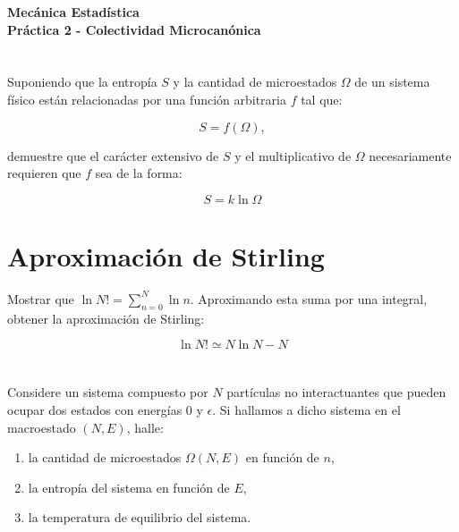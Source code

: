 \documentclass[a4paper,11pt]{article}
\begin{document}
\pagestyle{fancy}
\chead{\small \the\year}



\thispagestyle{plain}
\begin{center}
    \textbf{\large
        Mecánica Estadística \\
        Práctica 2 - Colectividad Microcanónica
    }
\end{center}
\vspace{-1.5em}



\section{}

Suponiendo que la entropía $S$ y la cantidad de microestados
$\Omega$ de un sistema físico están relacionadas por una función
arbitraria $f$ tal que:

$$ S = f(\Omega), $$

\noindent demuestre que el carácter extensivo de $S$ y el multiplicativo de
$\Omega$ necesariamente requieren que $f$ sea de la forma:

$$ S = k \ln \Omega $$



\section{Aproximación de Stirling}

Mostrar que $\ln N! = \sum_{n=0}^N \ln n$.
Aproximando esta suma por una integral, obtener la aproximación de
Stirling:

$$ \ln N! \simeq N \ln N - N $$


\section{}

Considere un sistema compuesto por $N$ partículas no interactuantes que pueden ocupar
dos estados con energías 0 y $\epsilon$.
Si hallamos a dicho sistema en el macroestado $(N, E)$, halle:

\begin{enumerate}[label=(\alph*),
                  leftmargin=2\parindent,
                  rightmargin=2\parindent]

    \item{la cantidad de microestados $\Omega(N, E)$ en función de $n$,}

    \item{la entropía del sistema en función de $E$,}

    \item{la temperatura de equilibrio del sistema.}

\end{enumerate}
\end{document}
